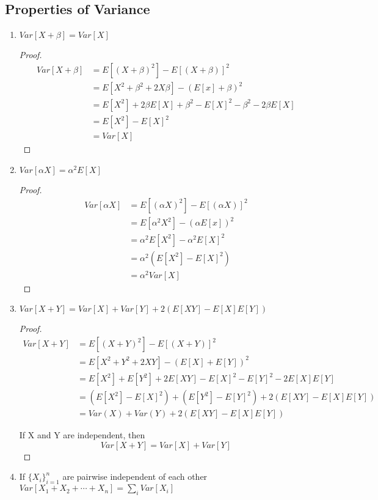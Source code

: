 \documentclass[12pt]{article}
\begin{document}
\subsection{Properties of Variance}
\begin{enumerate}
    \item $Var[X+\beta] =Var[X]$
    \begin{proof}
        \begin{align*}
            Var[X+\beta] &= E[(X+\beta)^2] - E[(X+\beta)]^2\\
                        &= E[X^2+\beta^2+2X\beta] - (E[x]+\beta)^2\\
                        &= E[X^2] +2\beta E[X] +\beta^2 -E[X]^2-\beta^2-2\beta E[X]\\
                        &= E[X^2]-E[X]^2\\
                        &= Var[X]
        \end{align*}
    \end{proof}
    \item $Var[\alpha X] = \alpha^2 E[X]$
    \begin{proof}
        \begin{align*}
            Var[\alpha X] &= E[(\alpha X)^2] - E[(\alpha X)]^2\\
                        &= E[\alpha^2 X^2] - (\alpha E[x])^2\\
                        &= \alpha^2 E[X^2] -\alpha^2 E[X]^2\\
                        &= \alpha^2(E[X^2]-E[X]^2)\\
                        &= \alpha^2 Var[X]
        \end{align*}
    \end{proof}
    \item $Var[X+Y] = Var[X]+Var[Y] +2 (E[XY]-E[X]E[Y])$
    \begin{proof}
        \begin{align*}
            Var[X+Y] &= E[(X+Y)^2] -E[(X+Y)]^2\\
                     &= E[X^2+Y^2+2XY] -(E[X]+E[Y])^2\\
                     &= E[X^2]+E[Y^2] +2E[XY] -E[X]^2-E[Y]^2-2E[X]E[Y]\\
                     &= (E[X^2]-E[X]^2)+(E[Y^2]-E[Y]^2)+2(E[XY]-E[X]E[Y])\\
                     &= Var(X) +Var(Y) +2(E[XY]-E[X]E[Y])
        \end{align*}
        
        If X and Y are independent, then 
        \[Var[X+Y]= Var[X]+Var[Y]\]
    \end{proof}
    \item  If $\{X_i\}_{i=1}^{n}$ are pairwise independent of each other \\ $Var[X_1 + X_2 + \cdots + X_n] = \sum_i Var[X_i]$ 
\end{enumerate}
\end{document}
